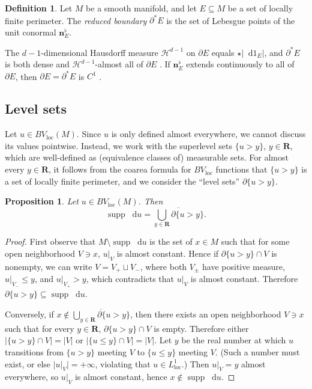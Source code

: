 \documentclass[reqno,11pt]{amsart}
\newcommand{\RR}{\mathbf{R}}
\newcommand*\dif{\mathop{}\!\mathrm{d}}
\DeclareMathOperator{\supp}{supp}
\newcommand{\normal}{\mathbf n}
\newcommand{\dfn}[1]{\emph{#1}\index{#1}}
\newcommand{\loc}{\mathrm{loc}}
\newtheorem{proposition}[theorem]{Proposition}
\theoremstyle{definition}
\newtheorem{definition}[theorem]{Definition}
\numberwithin{equation}{section}
\begin{document}
\begin{definition}
Let $M$ be a smooth manifold, and let $E \subseteq M$ be a set of locally finite perimeter.
The \dfn{reduced boundary} $\partial^* E$ is the set of Lebesgue points of the unit conormal $\normal_E^\flat$.
\end{definition}

The $d - 1$-dimensional Hausdorff measure $\mathcal H^{d - 1}$ on $\partial E$ equals $\star |\dif 1_E|$, and $\partial^* E$ is both dense and $\mathcal H^{d - 1}$-almost all of $\partial E$ \cite[Theorem 4.4]{Giusti77}.
If $\normal_E^\flat$ extends continuously to all of $\partial E$, then $\partial E = \partial^* E$ is $C^1$ \cite[Theorem 4.11]{Giusti77}.

\subsection{Level sets}
Let $u \in BV_\loc(M)$.
Since $u$ is only defined almost everywhere, we cannot discuss its values pointwise.
Instead, we work with the superlevel sets $\{u > y\}$, $y \in \RR$, which are well-defined as (equivalence classes of) measurable sets.
For almost every $y \in \RR$, it follows from the coarea formula for $BV_\loc$ functions \cite[Theorem 1.23]{Giusti77} that $\{u > y\}$ is a set of locally finite perimeter, and we consider the ``level sets'' $\partial \{u > y\}$.

\begin{proposition}
Let $u \in BV_\loc(M)$. Then 
\begin{equation}\label{level sets define support}
	\supp \dif u = \overline{\bigcup_{y \in \RR} \partial \{u > y\}}.
\end{equation}
\end{proposition}
\begin{proof}
First observe that $M \setminus \supp \dif u$ is the set of $x \in M$ such that for some open neighborhood $V \ni x$, $u|_V$ is almost constant.
Hence if $\partial \{u > y\} \cap V$ is nonempty, we can write $V = V_+ \sqcup V_-$, where both $V_\pm$ have positive measure, $u|_{V_-} \leq y$, and $u|_{V_+} > y$, which contradicts that $u|_V$ is almost constant.
Therefore $\partial \{u > y\} \subseteq \supp \dif u$.

Conversely, if $x \notin \overline{\bigcup_{y \in \RR} \partial \{u > y\}}$, then there exists an open neighborhood $V \ni x$ such that for every $y \in \RR$, $\partial \{u > y\} \cap V$ is empty.
Therefore either $|\{u > y\} \cap V| = |V|$ or $|\{u \leq y\} \cap V| = |V|$.
Let $y$ be the real number at which $u$ transitions from $\{u > y\}$ meeting $V$ to $\{u \leq y\}$ meeting $V$.
(Such a number must exist, or else $|u|_V| = +\infty$, violating that $u \in L^1_\loc$.)
Then $u|_V = y$ almost everywhere, so $u|_V$ is almost constant, hence $x \notin \supp \dif u$.
\end{proof}
\end{document}
